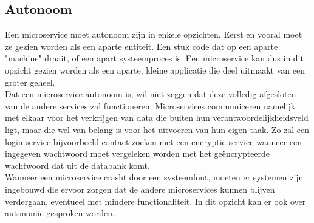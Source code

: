 \subsection{Autonoom}
\label{subsec:autonoom}
Een microservice moet  autonoom zijn in enkele opzichten. Eerst en vooral moet ze gezien worden als een aparte entiteit. Een stuk code dat op een aparte "machine" draait, of een apart systeemproces is. Een microservice kan dus in dit opzicht gezien worden als een aparte, kleine applicatie die deel uitmaakt van een groter geheel.
\\
Dat een microservice autonoom is, wil niet zeggen dat deze volledig afgesloten van de andere services zal functioneren. Microservices communiceren namelijk met elkaar voor het verkrijgen van data die buiten hun verantwoordelijkheidsveld ligt, maar die wel van belang is voor het uitvoeren van hun eigen taak. Zo zal een login-service bijvoorbeeld contact zoeken met een encryptie-service wanneer een ingegeven wachtwoord moet vergeleken worden met het geëncrypteerde wachtwoord dat uit de databank komt.
\\
Wanneer een microservice crasht door een systeemfout, moeten er systemen zijn ingebouwd die ervoor zorgen dat de andere microservices kunnen blijven verdergaan, eventueel met mindere functionaliteit. In dit opzicht kan er ook over autonomie gesproken worden.
\newpage
